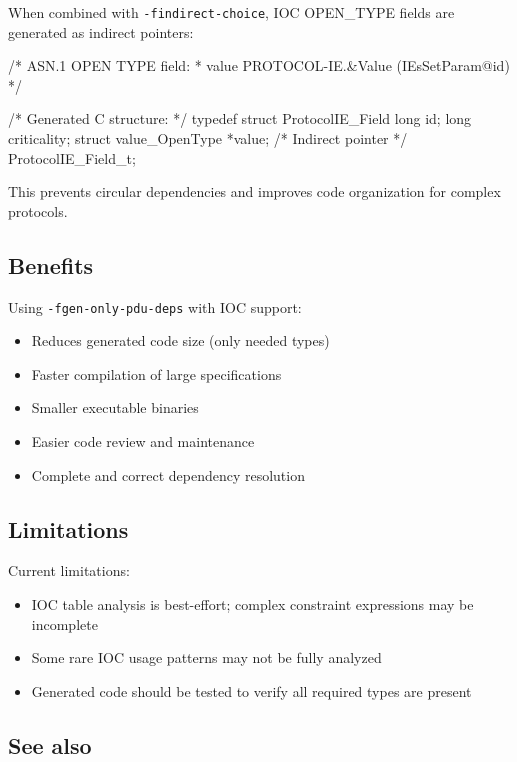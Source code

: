 \documentclass[english,oneside,12pt]{book}
\begin{document}
When combined with \texttt{-findirect-choice}, IOC OPEN\_TYPE fields are generated 
as indirect pointers:

\begin{example}
/* ASN.1 OPEN TYPE field:
 * value   PROTOCOL-IE.&Value  ({IEsSetParam}{@id})
 */

/* Generated C structure: */
typedef struct ProtocolIE_Field {
    long                     id;
    long                     criticality;
    struct value_OpenType   *value;  /* Indirect pointer */
} ProtocolIE_Field_t;
\end{example}

This prevents circular dependencies and improves code organization for complex protocols.

\subsection*{Benefits}

Using \texttt{-fgen-only-pdu-deps} with IOC support:
\begin{itemize}
\item Reduces generated code size (only needed types)
\item Faster compilation of large specifications
\item Smaller executable binaries
\item Easier code review and maintenance
\item Complete and correct dependency resolution
\end{itemize}

\subsection*{Limitations}

Current limitations:
\begin{itemize}
\item IOC table analysis is best-effort; complex constraint expressions may be incomplete
\item Some rare IOC usage patterns may not be fully analyzed
\item Generated code should be tested to verify all required types are present
\end{itemize}

\subsection*{See also}
\end{document}
